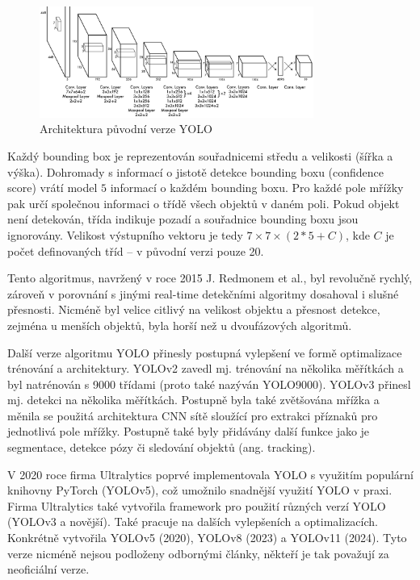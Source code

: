 \begin{figure}[]
    \centering
    \includegraphics[width=0.8\textwidth]{Figures/yolo}
    \caption{Architektura původní verze YOLO \cite{yolo}}
    \label{fig:yolo}
\end{figure}

Každý bounding box je reprezentován souřadnicemi středu a velikosti (šířka a
výška). Dohromady s informací o jistotě detekce bounding boxu (confidence
score) vrátí model $5$ informací o každém bounding boxu. Pro každé pole mřížky
pak určí společnou informaci o třídě všech objektů v daném poli. Pokud objekt
není detekován, třída indikuje pozadí a souřadnice bounding boxu jsou
ignorovány. Velikost výstupního vektoru je tedy $7 \times 7 \times (2 * 5 +
    C)$, kde $C$ je počet definovaných tříd – v původní verzi pouze 20.

Tento algoritmus, navržený v roce 2015 J. Redmonem et al., byl revolučně
rychlý, zároveň v porovnání s jinými real-time detekčními algoritmy dosahoval i
slušné přesnosti. Nicméně byl velice citlivý na velikost objektu a přesnost
detekce, zejména u menších objektů, byla horší než u dvoufázových algoritmů.

Další verze algoritmu YOLO přinesly postupná vylepšení ve formě optimalizace
trénování a architektury. YOLOv2 \cite{yolo9000} zavedl mj. trénování na
několika měřítkách a byl natrénován s 9000 třídami (proto také nazýván
YOLO9000). YOLOv3 \cite{yolov3} přinesl mj. detekci na několika měřítkách.
Postupně byla také zvětšována mřížka a měnila se použitá architektura CNN sítě
sloužící pro extrakci příznaků pro jednotlivá pole mřížky. Postupně také byly
přidávány další funkce jako je segmentace, detekce pózy či sledování objektů
(ang. tracking).


V 2020 roce firma Ultralytics poprvé implementovala YOLO s využitím populární
knihovny PyTorch (YOLOv5), což umožnilo snadnější využití YOLO v praxi. Firma
Ultralytics také vytvořila framework pro použití různých verzí YOLO (YOLOv3 a
novější). Také pracuje na dalších vylepšeních a optimalizacích. Konkrétně
vytvořila YOLOv5 (2020), YOLOv8 (2023) a YOLOv11 (2024). Tyto verze nicméně
nejsou podloženy odbornými články, někteří je tak považují za neoficiální
verze.

